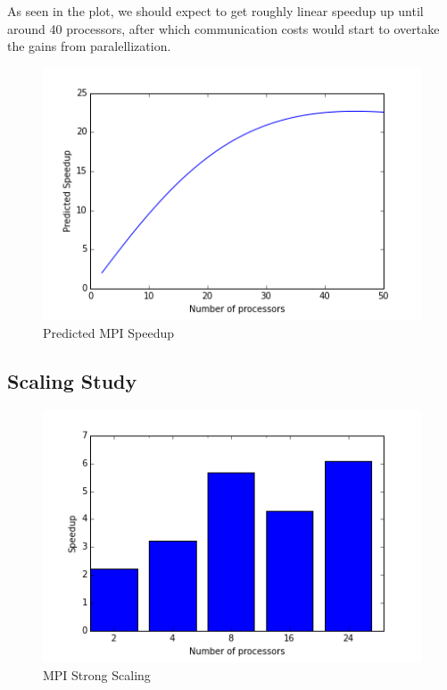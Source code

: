 \documentclass[11pt]{article}
\begin{document}
As seen in the plot, we should expect to get roughly linear speedup up until around 
40 processors, after which communication costs would start to overtake the gains from
paralellization.

\begin{figure}
\caption{Predicted MPI Speedup}
\label{mpi-predicted-speedup}
\includegraphics{../results/predicted_speedup.png}
\end{figure}

\subsection*{Scaling Study}



\begin{figure}
\caption{MPI Strong Scaling}
\label{mpi-strong-scaling}
\includegraphics{../results/mpi_strong.png}
\end{figure}
\end{document}
